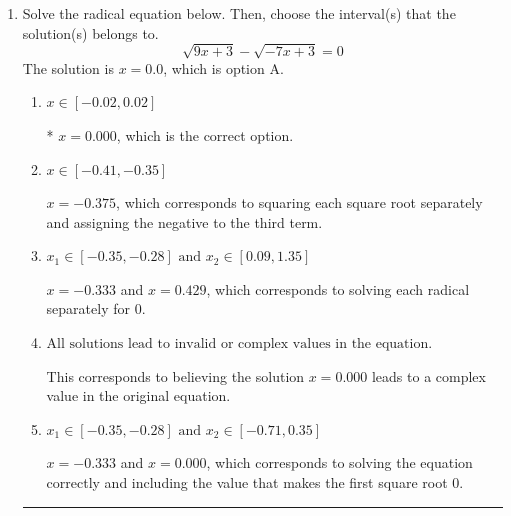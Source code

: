 \documentclass{extbook}[14pt]
\newcommand{\litem}[1]{\item #1

\rule{\textwidth}{0.4pt}}
\begin{document}
\begin{enumerate}\litem{
Solve the radical equation below. Then, choose the interval(s) that the solution(s) belongs to.
\[ \sqrt{9 x + 3} - \sqrt{-7 x + 3} = 0 \]The solution is \( x = 0.0 \), which is option A.\begin{enumerate}[label=\Alph*.]
\item \( x \in [-0.02,0.02] \)

* $x = 0.000$, which is the correct option.
\item \( x \in [-0.41,-0.35] \)

$x = -0.375$, which corresponds to squaring each square root separately and assigning the negative to the third term.
\item \( x_1 \in [-0.35, -0.28] \text{ and } x_2 \in [0.09,1.35] \)

$x = -0.333$ and $x = 0.429$, which corresponds to solving each radical separately for 0.
\item \( \text{All solutions lead to invalid or complex values in the equation.} \)

This corresponds to believing the solution $x = 0.000$ leads to a complex value in the original equation.
\item \( x_1 \in [-0.35, -0.28] \text{ and } x_2 \in [-0.71,0.35] \)

$x = -0.333$ and $x = 0.000$, which corresponds to solving the equation correctly and including the value that makes the first square root 0.
\end{enumerate}

}
\end{enumerate}
\end{document}
